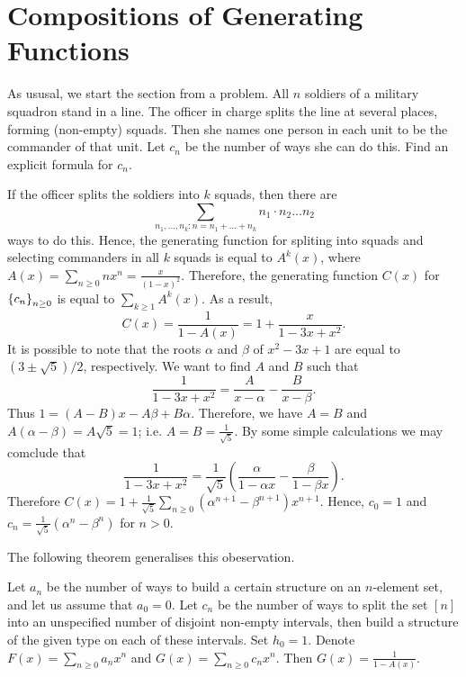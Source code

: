 \section{Compositions of Generating Functions}
As ususal, we start the section from a problem.
All $n$ soldiers of a military squadron stand in a line. The officer in charge
splits the line at several places, forming (non-empty) squads. Then she names
one person in each unit to be the commander of that unit. Let $c_n$ be the
number of ways she can do this. Find an explicit formula for $c_n$.

If the officer splits the soldiers into $k$ squads, then there
are
\[
  \sum_{n_1, \dots, n_k : n = n_1 + \dots + n_k} n_1 \cdot n_2 \dots n_2
\]
ways to do this. Hence, the generating function for spliting into squads and
selecting commanders in all $k$ squads is equal to $A^k(x)$, where
$A(x) = \sum_{n \ge 0} n x^n = \frac{x}{(1 - x)^2}$. Therefore,
the generating function $C(x)$ for $\set{c_n}_{n \ge 0}$ is equal to
$\sum_{k \ge 1} A^k(x)$. As a result,
\[
  C(x) = \frac{1}{1 - A(x)} = 1 + \frac{x}{1 - 3x + x^2}.
\]
It is possible to note that the roots $\alpha$ and $\beta$ of $x^2 - 3x + 1$ are
equal to $(3 \pm \sqrt{5}) / 2$, respectively. We want to find $A$ and $B$ such
that
\[
  \frac{1}{1 - 3x + x^2} = \frac{A}{x - \alpha} - \frac{B}{x - \beta}.
\]
Thus $1 = (A - B) x - A\beta + B\alpha$. Therefore, we have
$A = B$ and $A(\alpha - \beta) = A\sqrt{5} = 1$; i.e.
$A = B = \frac{1}{\sqrt{5}}$.
By some simple calculations we may comclude that
\[
  \frac{1}{1 - 3x + x^2} =
  \frac{1}{\sqrt{5}}(\frac{\alpha}{1 - \alpha x} - \frac{\beta}{1 - \beta x}).
\]
Therefore
$C(x) = 1 + \frac{1}{\sqrt{5}}
  \sum_{n \ge 0} (\alpha^{n + 1} - \beta^{n + 1}) x^{n + 1}$.
Hence, $c_0 = 1$ and $c_n = \frac{1}{\sqrt{5}}(\alpha^n - \beta^n)$ for $n > 0$.

The following theorem generalises this obeservation.
\begin{theorem}
  Let $a_n$ be the number of ways to build a certain structure on an $n$-element
  set, and let us assume that $a_0 = 0$. Let $c_n$ be the number of ways to
  split the set $[n]$ into an unspecified number of disjoint non-empty
  intervals, then build a structure of the given type on each of these
  intervals. Set $h_0 = 1$. Denote $F(x) = \sum_{n \ge 0} a_n x^n$ and
  $G(x) = \sum_{n \ge 0} c_n x^n$. Then $G(x) = \frac{1}{1 - A(x)}$.
\end{theorem}


